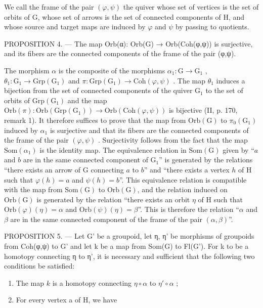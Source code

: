 We call the frame of the pair \((\varphi,\psi)\) the quiver whose set of vertices is the set of orbits of G, whose set of arrows is the set of connected components of H, and whose source and target maps are induced by \(\varphi\) and \(\psi\) by passing to quotients.

PROPOSITION 4. --- The map Orb(α): Orb(G) → Orb(Coh(φ,ψ)) is surjective, and its fibers are the connected components of the frame of the pair (φ,ψ).

The morphism \(\alpha\) is the composite of the morphisms \(\alpha_{1}\colon\mathrm{G}\to\mathrm{G}_{1}\) , \(\theta_{1}\colon\mathrm{G}_{1}\to\mathrm{Grp}(\mathrm{G}_{1})\) and \(\pi\colon\mathrm{Grp}(\mathrm{G}_{1})\to\mathrm{Coh}(\varphi,\psi)\) . The map \(\theta_{1}\) induces a bijection from the set of connected components of the quiver \(\mathrm{G}_{1}\) to the set of orbits of \(\mathrm{Grp}(\mathrm{G}_{1})\) and the map \(\mathrm{Orb}(\pi)\colon\mathrm{Orb}(\mathrm{Grp}(\mathrm{G}_{1}))\to\mathrm{Orb}(\mathrm{Coh}(\varphi,\psi))\) is bijective (II, p. 170, remark 1). It therefore suffices to prove that the map from \(\mathrm{Orb}(\mathrm{G})\) to \(\pi_{0}(\mathrm{G}_{1})\) induced by \(\alpha_{1}\) is surjective and that its fibers are the connected components of the frame of the pair \((\varphi,\psi)\) . Surjectivity follows from the fact that the map \(\mathrm{Som}(\alpha_{1})\) is the identity map. The equivalence relation in \(\mathrm{Som}(\mathrm{G})\) given by “\(a\) and \(b\) are in the same connected component of \(\mathrm{G}_{1}\)” is generated by the relations “there exists an arrow of G connecting \(a\) to \(b\)” and “there exists a vertex \(h\) of H such that \(\varphi(h)=a\) and \(\psi(h)=b\)”. This equivalence relation is compatible with the map from \(\mathrm{Som}(\mathrm{G})\) to \(\mathrm{Orb}(\mathrm{G})\), and the relation induced on \(\mathrm{Orb}(\mathrm{G})\) is generated by the relation “there exists an orbit \(\eta\) of H such that \(\mathrm{Orb}(\varphi)(\eta)=\alpha\) and \(\mathrm{Orb}(\psi)(\eta)=\beta\)”. This is therefore the relation “\(\alpha\) and \(\beta\) are in the same connected component of the frame of the pair \((\alpha,\beta)\)”.

PROPOSITION 5. --- Let G' be a groupoid, let η, η' be morphisms of groupoids from Coh(φ,ψ) to G' and let k be a map from Som(G) to Fl(G'). For k to be a homotopy connecting η to η', it is necessary and sufficient that the following two conditions be satisfied:

\begin{enumerate}
\def\labelenumi{(\roman{enumi})}
\item
  The map \(k\) is a homotopy connecting \(\eta \circ \alpha\) to \(\eta' \circ \alpha\) ;
\item
  For every vertex a of H, we have
\end{enumerate}

